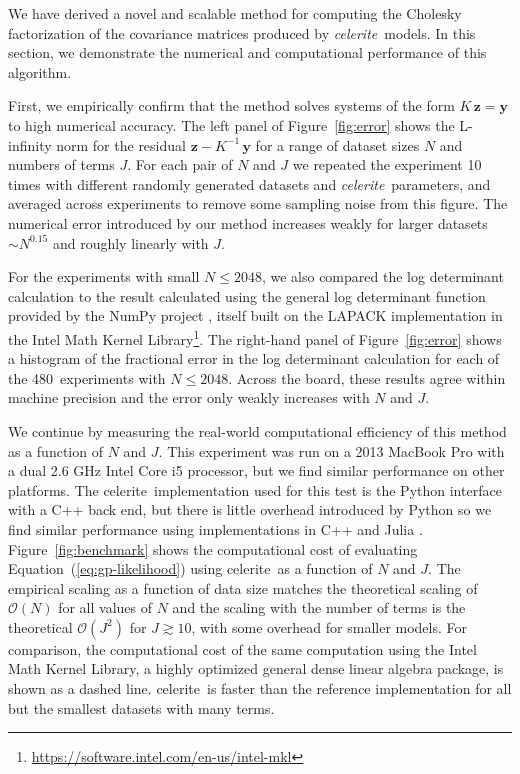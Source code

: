 \documentclass[manuscript, letterpaper]{aastex6}
\newcommand{\project}[1]{\textsf{#1}}
\newcommand{\celerite}{\project{celerite}}
\newcommand{\celeriteterm}{\emph{celerite}}
\newcommand{\figureref}[1]{\ref{fig:#1}}
\newcommand{\Figure}[1]{Figure~\figureref{#1}}
\renewcommand{\eqref}[1]{\ref{eq:#1}}
\newcommand{\Eq}[1]{Equation~(\eqref{#1})}
\newcommand{\eq}[1]{\Eq{#1}}
\newcommand{\bvec}[1]{{\ensuremath{\boldsymbol{#1}}}}
\begin{document}
We have derived a novel and scalable method for computing the Cholesky
factorization of the covariance matrices produced by \celeriteterm\ models.
In this section, we demonstrate the numerical and computational performance of
this algorithm.

First, we empirically confirm that the method solves systems of the form
$K\,\bvec{z} = \bvec{y}$ to high numerical accuracy.
The left panel of \Figure{error} shows the L-infinity norm for the residual
$\bvec{z} - K^{-1}\,\bvec{y}$ for a range of dataset sizes $N$ and numbers of
terms $J$.
For each pair of $N$ and $J$ we repeated the experiment 10 times with
different randomly generated datasets and \celeriteterm\ parameters, and
averaged across experiments to remove some sampling noise from this figure.
The numerical error introduced by our method increases weakly for larger
datasets $\sim N^{0.15}$ and roughly linearly with $J$.

For the experiments with small $N \le 2048$, we also compared the log
determinant calculation to the result calculated using the general log
determinant function provided by the \project{NumPy} project
\citep{Van-Der-Walt:2011}, itself built on the \project{LAPACK}
\citep{Anderson:1999} implementation in the Intel Math Kernel
Library\footnote{\url{https://software.intel.com/en-us/intel-mkl}}.
The right-hand panel of \Figure{error} shows a histogram of the fractional
error in the log determinant calculation for each of the 480~experiments with
$N \le 2048$.
Across the board, these results agree within machine precision and the error
only weakly increases with $N$ and $J$.

We continue by measuring the real-world computational efficiency of this
method as a function of $N$ and $J$.
This experiment was run on a 2013 MacBook Pro with a dual 2.6 GHz Intel Core
i5 processor, but we find similar performance on other platforms.
The \celerite\ implementation used for this test is the \project{Python}
interface with a \project{C++} back end, but there is little overhead
introduced by \project{Python} so we find similar performance using
implementations in \project{C++} and \project{Julia} \citep{Bezanzon:2012}.
\Figure{benchmark} shows the computational cost of evaluating
\eq{gp-likelihood} using \celerite\ as a function of $N$ and $J$.
The empirical scaling as a function of data size matches the theoretical
scaling of $\mathcal{O}(N)$ for all values of $N$ and the scaling with the
number of terms is the theoretical $\mathcal{O}(J^2)$ for $J \gtrsim 10$, with
some overhead for smaller models.
For comparison, the computational cost of the same computation using the Intel
Math Kernel Library, a highly optimized general dense linear algebra package,
is shown as a dashed line.
\celerite\ is faster than the reference implementation for all but the
smallest datasets with many terms.
\end{document}
